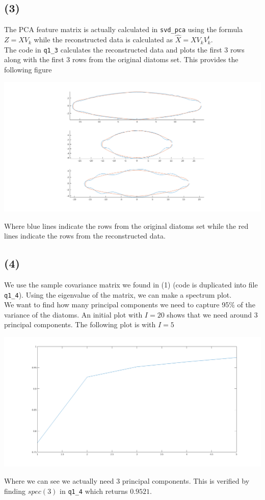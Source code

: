 \documentclass[a4paper]{article}
\begin{document}
\subsection*{(3)}
The PCA feature matrix is actually calculated in \texttt{svd\_pca} using the formula $Z = XV_k$ while the reconstructed data is calculated as $\hat{X} = XV_kV^t_k$.\\
The code in \texttt{q1\_3} calculates the reconstructed data and plots the first $3$ rows along with the first $3$ rows from the original diatoms set. This provides the following figure
\begin{center}
\includegraphics[scale=0.4]{fig3}
\end{center}
Where blue lines indicate the rows from the original diatoms set while the red lines indicate the rows from the reconstructed data.

\subsection*{(4)}
We use the sample covariance matrix we found in (1) (code is duplicated into file \texttt{q1\_4}). Using the eigenvalue of the matrix, we can make a spectrum plot.\\
We want to find how many principal components we need to capture 95\% of the variance of the diatoms. An initial plot with $I=20$ shows that we need around $3$ principal components. The following plot is with $I=5$
\begin{center}
\includegraphics[scale=0.35]{fig4}
\end{center}
Where we can see we actually need $3$ principal components. This is verified by finding $spec(3)$ in \texttt{q1\_4} which returns $0.9521$.
\end{document}
